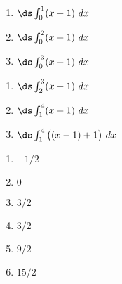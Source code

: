 {\noindent
\begin{minipage}{\linewidth}
\end{minipage}

\noindent\begin{minipage}[t]{.5\linewidth}
\begin{enumerate}
\item		$\ds \int_0^1 (x-1)\ dx$
\item		$\ds \int_0^2 (x-1)\ dx$
\item		$\ds \int_0^3 (x-1)\ dx$
\end{enumerate}
\end{minipage}
\begin{minipage}[t]{.5\linewidth}
\begin{enumerate}\addtocounter{enumii}{3}
\item		$\ds \int_2^3 (x-1)\ dx$
\item		$\ds \int_1^4 (x-1)\ dx$
\item		$\ds \int_1^4 \big((x-1)+1\big)\ dx$
\end{enumerate}
\end{minipage}
}
{\begin{enumerate}
\item		$-1/2$
\item		$0$
\item		$3/2$
\item		$3/2$
\item		$9/2$
\item		$15/2$
\end{enumerate}
}

